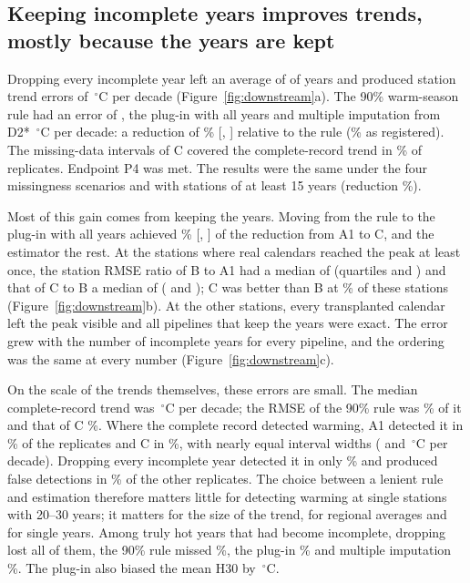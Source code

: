 \documentclass[draft]{agujournal2025}
\begin{document}
\subsection{Keeping incomplete years improves trends, mostly because the years are kept}
Dropping every incomplete year left an average of \TYearsAZero{} of \TYearsAll{} years and produced station trend errors of \TTrendRmseAZero\,$^{\circ}$C per decade (Figure~\ref{fig:downstream}a). The 90\% warm-season rule had an error of \TTrendRmseAOne, the plug-in with all years \TTrendRmseB{} and multiple imputation from D2* \TTrendRmseC\,$^{\circ}$C per decade: a reduction of \TTrendReduction\% [\TTrendReductionLow, \TTrendReductionHigh] relative to the rule (\TTrendReductionRone\% as registered). The missing-data intervals of C covered the complete-record trend in \TTrendCoverage\% of replicates. Endpoint P4 was met. The results were the same under the four missingness scenarios and with \TTrendStationsFifteen{} stations of at least 15 years (reduction \TTrendReductionFifteen\%).

Most of this gain comes from keeping the years. Moving from the rule to the plug-in with all years achieved \TShareKeep\% [\TShareKeepLow, \TShareKeepHigh] of the reduction from A1 to C, and the estimator the rest. At the \TNStationsRatio{} stations where real calendars reached the peak at least once, the station RMSE ratio of B to A1 had a median of \TRatioBAOne{} (quartiles \TRatioBAOneLow{} and \TRatioBAOneHigh) and that of C to B a median of \TRatioCB{} (\TRatioCBLow{} and \TRatioCBHigh); C was better than B at \TRatioCBBelow\% of these stations (Figure~\ref{fig:downstream}b). At the other \TNStationsBExact{} stations, every transplanted calendar left the peak visible and all pipelines that keep the years were exact. The error grew with the number of incomplete years for every pipeline, and the ordering was the same at every number (Figure~\ref{fig:downstream}c).

On the scale of the trends themselves, these errors are small. The median complete-record trend was \TMedianTrend\,$^{\circ}$C per decade; the RMSE of the 90\% rule was \TRmseAOneShare\% of it and that of C \TRmseCShare\%. Where the complete record detected warming, A1 detected it in \TDetectAOne\% of the replicates and C in \TDetectC\%, with nearly equal interval widths (\TCiWidthAOne{} and \TCiWidthC\,$^{\circ}$C per decade). Dropping every incomplete year detected it in only \TDetectAZero\% and produced false detections in \TFalseDetectAZero\% of the other replicates. The choice between a lenient rule and estimation therefore matters little for detecting warming at single stations with 20--30 years; it matters for the size of the trend, for regional averages and for single years. Among truly hot years that had become incomplete, dropping lost all of them, the 90\% rule missed \THotMissedAOne\%, the plug-in \THotMissedB\% and multiple imputation \THotMissedC\%. The plug-in also biased the mean H30 by \TMeanBiasB\,$^{\circ}$C.
\end{document}
